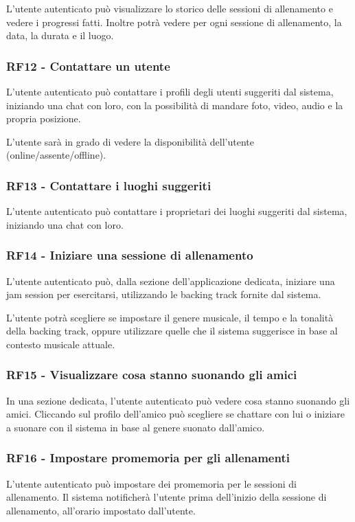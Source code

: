 \documentclass[12pt, a4paper]{article}
\begin{document}
L'utente autenticato può visualizzare lo storico delle sessioni di allenamento e vedere i progressi fatti. Inoltre potrà vedere per ogni sessione di allenamento, la data, la durata e il luogo.

\subsubsection*{\hypertarget{RF12}{RF12 - Contattare un utente}}

L'utente autenticato può contattare i profili degli utenti suggeriti dal sistema, iniziando una chat con loro, con la possibilità di mandare foto, video, audio e la propria posizione.

L'utente sarà in grado di vedere la disponibilità dell'utente (online/assente/offline).


\subsubsection*{\hypertarget{RF13}{RF13 - Contattare i luoghi suggeriti}}

L'utente autenticato può contattare i proprietari dei luoghi suggeriti dal sistema, iniziando una chat con loro.

\subsubsection*{\hypertarget{RF14}{RF14 - Iniziare una sessione di allenamento}}

L'utente autenticato può, dalla sezione dell'applicazione dedicata, iniziare una jam session per esercitarsi, utilizzando le backing track fornite dal sistema.

L'utente potrà scegliere se impostare il genere musicale, il tempo e la tonalità della backing track, oppure utilizzare quelle che il sistema suggerisce in base al contesto musicale attuale.


\subsubsection*{\hypertarget{RF15}{RF15 - Visualizzare cosa stanno suonando gli amici}}

In una sezione dedicata, l'utente autenticato può vedere cosa stanno suonando gli amici. Cliccando sul profilo dell'amico può scegliere se chattare con lui o iniziare a suonare con il sistema in base al genere suonato dall'amico.

\subsubsection*{\hypertarget{RF16}{RF16 - Impostare promemoria per gli allenamenti}} L'utente autenticato può impostare dei promemoria per le sessioni di allenamento. Il sistema notificherà l'utente prima dell'inizio della sessione di allenamento, all'orario impostato dall'utente.
\end{document}
